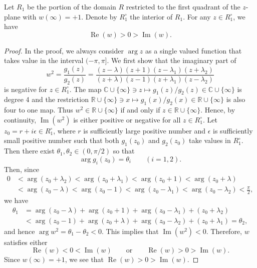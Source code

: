 \documentclass[10pt,a4paper]{amsart}
\renewcommand{\Im}{\operatorname{Im}}
\renewcommand{\Re}{\operatorname{Re}}
\begin{document}
\begin{lemma}\label{lm:ReImw}
Let $R_1$ be the portion of the domain $R$ restricted to the first quadrant of the $z$-plane with $w(\infty)=+1$. 
Denote by $R_1^\circ$ the interior of $R_1$. 
For any $z\in R_1^\circ$, we have
\[
\Re(w)>0>\Im(w). 
\]
\end{lemma}

\begin{proof}
In the proof, we always consider $\arg z$ as a single valued function that takes value 
in the interval $(-\pi,\pi]$. 
We first show that the imaginary part of 
\[
w^2=\frac{g_1(z)}{g_2(z)}
   =\frac{(z-\lambda)(z+1)(z-\lambda_1)(z+\lambda_2)}{(z+\lambda)(z-1)(z+\lambda_1)(z-\lambda_2)}
\]
is negative for $z\in R_1^\circ$. 
The map $\mathbb{C}\cup\{\infty\}\ni z\mapsto g_1(z)/g_2(z)\in\mathbb{C}\cup\{\infty\}$ is degree 4 
and the restriction $\mathbb{R}\cup\{\infty\}\ni x\mapsto g_1(x)/g_2(x)\in\mathbb{R}\cup\{\infty\}$ 
is also four to one map. 
Thus $w^2\in\mathbb{R}\cup\{\infty\}$ if and only if $z\in\mathbb{R}\cup\{\infty\}$. 
Hence, by continuity, $\Im(w^2)$ is either positive or negative for all $z\in R_1^\circ$. 
Let $z_0=r+i\epsilon\in R_1^\circ$, where $r$ is sufficiently large positive number and 
$\epsilon$ is sufficiently small positive number such that both $g_1(z_0)$ and $g_2(z_0)$ take 
values in $R_1^\circ$. 
Then there exist $\theta_1,\theta_2\in (0,\pi/2)$ so that 
\[
\arg g_i(z_0) = \theta_i\qquad (i=1,2). 
\]
Then, since 
\begin{align*}
0&<\arg (z_0+\lambda_2)
  <\arg (z_0+\lambda_1)
  <\arg (z_0+1)
  <\arg (z_0+\lambda) \\
 &<\arg (z_0-\lambda)
  <\arg (z_0-1)
  <\arg (z_0-\lambda_1)
  <\arg (z_0-\lambda_2)
  <\frac{\pi}{2}, 
\end{align*}
we have 
\begin{align*}
\theta_1
&=\arg (z_0-\lambda)+\arg (z_0+1)+\arg (z_0-\lambda_1)+(z_0+\lambda_2) \\
&<\arg (z_0-1)+\arg (z_0+\lambda)+\arg (z_0-\lambda_2)+(z_0+\lambda_1)
 =\theta_2,  
\end{align*}
and hence $\arg w^2=\theta_1-\theta_2<0$. 
This implies that $\Im(w^2)<0$. 
Therefore, $w$ satisfies either
\[
\Re(w)<0<\Im(w)
\qquad\mbox{or}\qquad
\Re(w)>0>\Im(w). 
\]
Since $w(\infty)=+1$, we see that $\Re(w)>0>\Im(w)$. 
\end{proof}
\end{document}
